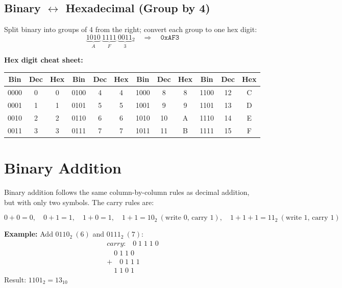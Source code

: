 \documentclass[11pt, letterpaper]{article}
\begin{document}
\subsection*{Binary $\leftrightarrow$ Hexadecimal (Group by 4)}
Split binary into groups of 4 from the right; convert each group to one hex digit:
\[
  \underbrace{1010}_{A}\ \underbrace{1111}_{F}\ \underbrace{0011}_{3}{}_{2}
  \quad \Longrightarrow \quad \texttt{0xAF3}
\]

\begin{tcolorbox}[colback=notebg, colframe=noteborder, arc=3pt, boxrule=1pt]
\textbf{Hex digit cheat sheet:}
\begin{center}
\renewcommand{\arraystretch}{1.2}
\begin{tabular}{ccc|ccc|ccc|ccc}
\textbf{Bin} & \textbf{Dec} & \textbf{Hex} &
\textbf{Bin} & \textbf{Dec} & \textbf{Hex} &
\textbf{Bin} & \textbf{Dec} & \textbf{Hex} &
\textbf{Bin} & \textbf{Dec} & \textbf{Hex} \\
\hline
0000 & 0  & 0 & 0100 & 4  & 4 & 1000 & 8  & 8 & 1100 & 12 & C \\
0001 & 1  & 1 & 0101 & 5  & 5 & 1001 & 9  & 9 & 1101 & 13 & D \\
0010 & 2  & 2 & 0110 & 6  & 6 & 1010 & 10 & A & 1110 & 14 & E \\
0011 & 3  & 3 & 0111 & 7  & 7 & 1011 & 11 & B & 1111 & 15 & F \\
\end{tabular}
\end{center}
\end{tcolorbox}

\section*{Binary Addition}

Binary addition follows the same column-by-column rules as decimal addition, but with only two symbols. The carry rules are:

\[
  0+0=0,\quad 0+1=1,\quad 1+0=1,\quad 1+1=10_2\ (\text{write 0, carry 1}),\quad 1+1+1=11_2\ (\text{write 1, carry 1})
\]

\begin{tcolorbox}[colback=part2bg, colframe=sectiongreen, arc=3pt, boxrule=1pt]
\textbf{Example:} Add $0110_2\ (6)$ and $0111_2\ (7)$:
\[
\begin{array}{r}
  \textit{carry:}\quad 0\;1\;1\;1\;0 \\
  \phantom{+\ }0\;1\;1\;0 \\
  +\quad 0\;1\;1\;1 \\
  \hline
  \phantom{+\ }1\;1\;0\;1
\end{array}
\]
Result: $1101_2 = 13_{10}$ \checkmark
\end{tcolorbox}
\end{document}
